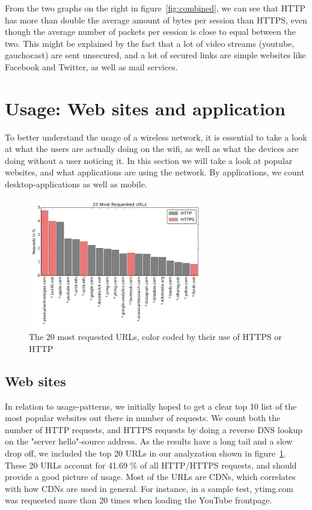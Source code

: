 \documentclass[letterpaper,twocolumn,10pt]{article}
\begin{document}
From the two graphs on the right in figure~\ref{fig:combined}, we can see that HTTP has more than double the average amount of bytes per session than HTTPS, even though the average number of packets per session is close to equal between the two. This might be explained by the fact that a lot of video streams (youtube, gauchocast) are sent unsecured, and a lot of secured links are simple websites like Facebook and Twitter, as well as mail services.

\section{Usage: Web sites and application}

To better understand the usage of a wireless network, it is essential to take a look at what the users are actually doing on the wifi, as well as what the devices are doing without a user noticing it. In this section we will take a look at popular websites, and what applications are using the network. By applications, we count desktop-applications as well as mobile.

\begin{figure}[!htb] 
\begin{center} 
\includegraphics[width=3in]{websites.png} 
\caption{The 20 most requested URLs, color coded by their use of HTTPS or HTTP} 
\label{fig:websites} 
\end{center} 
\end{figure}

\subsection{Web sites}

In relation to usage-patterns, we initially hoped to get a clear top 10 list of the most popular websites out there in number of requests. We count both the number of HTTP requests, and HTTPS requests by doing a reverse DNS lookup on the "server hello"-source address. As the results have a long tail and a slow drop off, we included the top 20 URLs in our analyzation shown in figure~\ref{fig:websites}. These 20 URLs account for 41.69 \% of all HTTP/HTTPS requests, and should provide a good picture of usage. Most of the URLs are CDNs, which correlates with how CDNs are used in general. For instance, in a sample test, ytimg.com was requested more than 20 times when loading the YouTube frontpage. 
\end{document}
